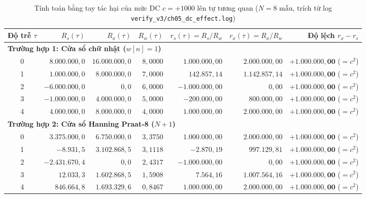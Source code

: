 \begin{table}[H]
\centering
\caption{Tính toán bằng tay tác hại của mức DC $c = +1000$ lên tự tương quan ($N = 8$ mẫu, trích từ log \texttt{verify\_v3/ch05\_dc\_effect.log})}
\label{tab:ch05_dc_hand_calc}
\footnotesize
\begin{tabular}{crrrrrr}
\toprule
\textbf{Độ trễ $\tau$} & \textbf{$R_s(\tau)$} & \textbf{$R_x(\tau)$} & \textbf{$R_w(\tau)$} & \textbf{$r_s(\tau) = R_s/R_w$} & \textbf{$r_x(\tau) = R_x/R_w$} & \textbf{Độ lệch $r_x - r_s$} \\
\midrule
\multicolumn{7}{l}{\textbf{Trường hợp 1: Cửa sổ chữ nhật ($w[n] = 1$)}} \\
0 & $8.000.000{,}0$ & $16.000.000{,}0$ & $8{,}0000$ & $1.000.000{,}00$ & $2.000.000{,}00$ & $\mathbf{+1.000.000{,}00}$ ($= c^2$) \\
1 & $1.000.000{,}0$ & $8.000.000{,}0$  & $7{,}0000$ & $142.857{,}14$   & $1.142.857{,}14$ & $\mathbf{+1.000.000{,}00}$ ($= c^2$) \\
2 & $-6.000.000{,}0$ & $0{,}0$         & $6{,}0000$ & $-1.000.000{,}00$ & $0{,}00$         & $\mathbf{+1.000.000{,}00}$ ($= c^2$) \\
3 & $-1.000.000{,}0$ & $4.000.000{,}0$  & $5{,}0000$ & $-200.000{,}00$  & $800.000{,}00$   & $\mathbf{+1.000.000{,}00}$ ($= c^2$) \\
4 & $4.000.000{,}0$ & $8.000.000{,}0$  & $4{,}0000$ & $1.000.000{,}00$ & $2.000.000{,}00$ & $\mathbf{+1.000.000{,}00}$ ($= c^2$) \\
\midrule
\multicolumn{7}{l}{\textbf{Trường hợp 2: Cửa sổ Hanning Praat-8 ($N+1$)}} \\
0 & $3.375.000{,}0$ & $6.750.000{,}0$ & $3{,}3750$ & $1.000.000{,}00$ & $2.000.000{,}00$ & $\mathbf{+1.000.000{,}00}$ ($= c^2$) \\
1 & $-8.931{,}5$    & $3.102.868{,}5$ & $3{,}1118$ & $-2.870{,}19$    & $997.129{,}81$   & $\mathbf{+1.000.000{,}00}$ ($= c^2$) \\
2 & $-2.431.670{,}4$ & $0{,}0$         & $2{,}4317$ & $-1.000.000{,}00$ & $0{,}00$         & $\mathbf{+1.000.000{,}00}$ ($= c^2$) \\
3 & $12.033{,}3$    & $1.602.868{,}5$ & $1{,}5908$ & $7.564{,}16$     & $1.007.564{,}16$ & $\mathbf{+1.000.000{,}00}$ ($= c^2$) \\
4 & $846.664{,}8$   & $1.693.329{,}6$ & $0{,}8467$ & $1.000.000{,}00$ & $2.000.000{,}00$ & $\mathbf{+1.000.000{,}00}$ ($= c^2$) \\
\bottomrule
\end{tabular}
\end{table}

